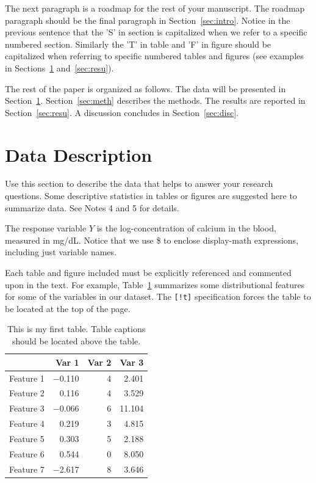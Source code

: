 \documentclass[12pt]{article}
\begin{document}
The next paragraph is a roadmap for the rest of your manuscript.  The
roadmap paragraph should be the final paragraph in Section~\ref{sec:intro}.
Notice in the previous sentence that the 'S' in section is capitalized when we 
refer to a specific numbered section. Similarly the 'T' in table and
'F' in figure should be capitalized when referring to specific numbered tables 
and figures (see examples in Sections~\ref{sec:data} and~\ref{sec:resu}).


The rest of the paper is organized as follows. The data will be presented in 
Section~\ref{sec:data}. Section~\ref{sec:meth} describes the methods. The 
results are reported in Section~\ref{sec:resu}. A discussion concludes in 
Section~\ref{sec:disc}.  



\section{Data Description}
\label{sec:data}

Use this section to describe the data that helps to answer your research
questions. Some descriptive statistics in tables or figures are suggested 
here to summarize data.  See Notes 4 and 5 for details.


The response variable $Y$ is the log-concentration of calcium in the blood, 
measured in mg/dL. Notice that we use \$ to enclose display-math expressions, 
including just variable names.   


Each table and figure included must be explicitly referenced and commented upon
in the text.  For example, Table~\ref{tab:rv} summarizes some distributional 
features for some of the variables in our dataset. The \verb|[!t]| specification 
forces the table to be located at the top of the page. 

\begin{table}[!t]
  \caption{This is my first table.  Table captions should be located above the
	table.}
	\label{tab:rv}
\centering
\begin{tabular}{lrrr}
  \toprule
& Var 1 & Var 2 & Var 3 \\ 
  \midrule
Feature 1 & $-$0.110 & 4 & 2.401 \\ 
Feature 2 &    0.116 & 4 & 3.529 \\ 
Feature 3 & $-$0.066 & 6 & 11.104 \\ 
Feature 4 &    0.219 & 3 & 4.815 \\ 
Feature 5 &    0.303 & 5 & 2.188 \\ 
Feature 6 &    0.544 & 0 & 8.050 \\ 
Feature 7 & $-$2.617 & 8 & 3.646 \\ 
  \bottomrule
\end{tabular}
\end{table}
\end{document}
